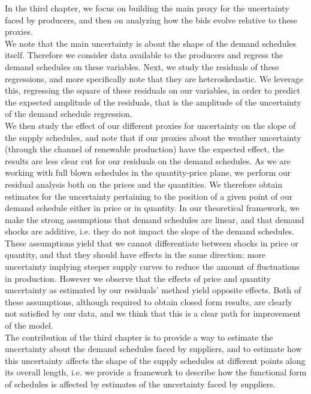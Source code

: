 In the third chapter, we focus on building the main proxy for the uncertainty faced by producers, and then on analyzing how the bids evolve relative to these proxies.\\

We note that the main uncertainty is about the shape of the demand schedules itself. Therefore we consider data available to the producers and regress the demand schedules on these variables. Next, we study the residuals of these regressions, and more specifically note that they are heteroskedastic. We leverage this, regressing the square of these residuals on our variables, in order to predict the expected amplitude of the residuals, that is the amplitude of the uncertainty of the demand schedule regression.\\

We then study the effect of our different proxies for uncertainty on the slope of the supply schedules, and note that if our proxies about the weather uncertainty (through the channel of renewable production) have the expected effect, the results are less clear cut for our residuals on the demand schedules. As we are working with full blown schedules in the quantity-price plane, we perform our residual analysis both on the prices and the quantities. We therefore obtain estimates for the uncertainty pertaining to the position of a given point of our demand schedule either in price or in quantity. In our theoretical framework, we make the strong assumptions that demand schedules are linear, and that demand shocks are additive, i.e. they do not impact the slope of the demand schedules. These assumptions yield that we cannot differentiate between shocks in price or quantity, and that they should have effects in the same direction: more uncertainty implying steeper supply curves to reduce the amount of fluctuations in production. However we observe that the effects of price and quantity uncertainty as estimated by our residuals' method yield opposite effects. Both of these assumptions, although required to obtain closed form results, are clearly not satisfied by our data, and we think that this is a clear path for improvement of the model.  \\

The contribution of the third chapter is to provide a way to estimate the uncertainty about the demand schedules faced by suppliers, and to estimate how this uncertainty affects the shape of the supply schedules at different points along its overall length, i.e. we provide a framework to describe how the functional form of schedules is affected by estimates of the uncertainty faced by suppliers.\\





 